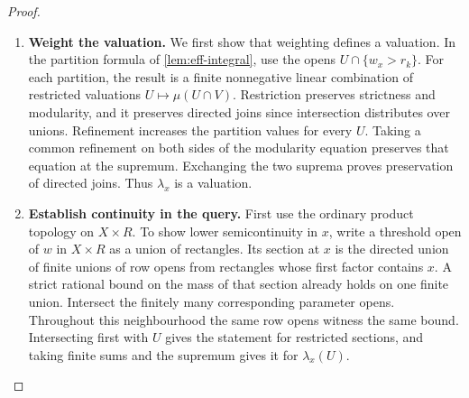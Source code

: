 \documentclass[11pt,a4paper]{article}
\theoremstyle{definition}
\theoremstyle{remark}\newaliascnt{remark}{theorem}
\numberwithin{equation}{section}
\begin{document}
\begin{proof}\leavevmode
\begin{enumerate}[titledsteps]
    \item \textbf{Weight the valuation.} We first show that weighting defines a valuation. In the partition formula of \cref{lem:eff-integral}, use the opens $U\cap\{w_x>r_k\}$. For each partition, the result is a finite nonnegative linear combination of restricted valuations $U\mapsto\mu(U\cap V)$. Restriction preserves strictness and modularity, and it preserves directed joins since intersection distributes over unions. Refinement increases the partition values for every $U$. Taking a common refinement on both sides of the modularity equation preserves that equation at the supremum. Exchanging the two suprema proves preservation of directed joins. Thus $\lambda_x$ is a valuation.


    \item \textbf{Establish continuity in the query.} First use the ordinary product topology on $X\times R$. To show lower semicontinuity in $x$, write a threshold open of $w$ in $X\times R$ as a union of rectangles. Its section at $x$ is the directed union of finite unions of row opens from rectangles whose first factor contains $x$. A strict rational bound on the mass of that section already holds on one finite union. Intersect the finitely many corresponding parameter opens. Throughout this neighbourhood the same row opens witness the same bound. Intersecting first with $U$ gives the statement for restricted sections, and taking finite sums and the supremum gives it for $\lambda_x(U)$.



\end{enumerate}
\end{proof}
\end{document}

